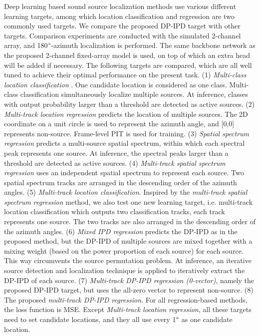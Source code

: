 \documentclass[lettersize,journal]{IEEEtran}
\begin{document}
Deep learning based sound source localization methods use various different learning targets, among which location classification and regression are two commonly used targets. We compare the proposed DP-IPD target with other targets.  Comparison experiments are conducted with the simulated 2-channel array, and 180$\degree$-azimuth localization is performed. The same backbone network as the proposed 2-channel fixed-array model is used, on top of which an extra head will be added if necessary. The following targets are compared, which are all well tuned to achieve their optimal performance on the present task. (1) \textit{Multi-class location classification} \cite{Grumiaux2021SaladnetSM}. One candidate location is considered as one class. Multi-class classification simultaneously localize multiple sources. At inference, classes with output probability larger than a threshold are detected as active sources.  (2) \textit{Multi-track location regression} \cite{Shimada2021MultiACCDOALA} predicts the location of multiple sources. The 2D coordinate on a unit circle is used to represent the azimuth angle, and [0,0] represents non-source. Frame-level PIT is used for training. (3) \textit{Spatial spectrum regression} \cite{He2021NeuralNA} predicts a multi-source spatial spectrum, within which each spectral peak represents one source. At inference, the spectral peaks larger than a threshold are detected as active sources. (4) \textit{Multi-track spatial spectrum regression} \cite{Yin2022MIMODoAnetMI} uses an independent spatial spectrum to represent each source. Two spatial spectrum tracks are arranged in the descending order of the azimuth angles. (5) \textit{Multi-track location classification}. Inspired by the \textit{multi-track spatial spectrum regression} method, we also test one new learning target, i.e. multi-track location classification which outputs two classification tracks, each track represents one source. The two tracks are also arranged in the descending order of the azimuth angles. (6) \textit{Mixed IPD regression} \cite{Yang2022SRPDNNLD} predicts the DP-IPD as in the proposed method, but the DP-IPD of multiple sources are mixed together with a mixing weight (based on the power proportion of each source) for each source. This way circumvents the source permutation problem. At inference, an iterative source detection and localization technique is applied to iteratively extract the DP-IPD of each source. (7) \textit{Multi-track DP-IPD regression (0-vector)}, namely the proposed DP-IPD target, but uses the all-zero vector to represent non-source. (8) The proposed \textit{multi-track DP-IPD regression}. 
For all regression-based methods, the loss function is MSE. Except \textit{Multi-track location regression}, all these targets need to set candidate locations, and they all use every 1$\degree$ as one candidate location.   
\end{document}

